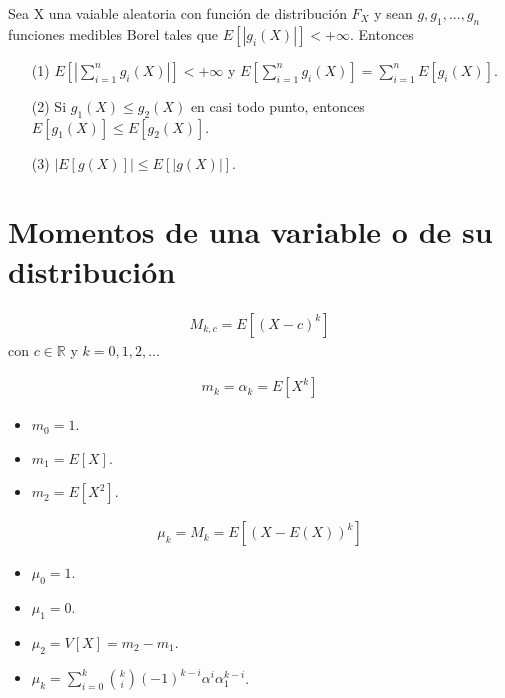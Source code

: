 \begin{prop}
    Sea X una vaiable aleatoria con función de distribución $F_X$ y sean $g,g_1,...,g_n$ funciones medibles Borel tales que $E[|g_i(X)|] < +\infty$. Entonces
    \begin{enumerate}
        \item[(1)] $E[|\sum_{i=1}^{n}g_i(X)|] < +\infty$ y $E[\sum_{i=1}^{n}g_i(X)] = \sum_{i=1}^{n}{E[g_i(X)]}$.
        \item[(2)] Si $g_1(X) \leq g_2(X)$ en casi todo punto, entonces $E[g_1(X)] \leq E[g_2(X)]$.
        \item[(3)] $|E[g(X)]| \leq E[|g(X)|]$.
    \end{enumerate}
\end{prop}

\section{Momentos de una variable o de su distribución}

\begin{defi}
    \begin{align*}
        M_{k,c} = E[(X - c)^k]
    \end{align*}
    con $c \in \mathbb{R}$ y $k = 0, 1, 2,...$
\end{defi}

\begin{defi}
    \begin{align*}
        m_k = \alpha_k = E[X^k]
    \end{align*}
    \begin{itemize}
        \item $m_0 = 1$.
        \item $m_1 = E[X]$.
        \item $m_2 = E[X^2]$.
    \end{itemize}
\end{defi}

\begin{defi}
    \begin{align*}
        \mu_k = M_k =  E[(X - E(X))^k]
    \end{align*}
    \begin{itemize}
        \item $\mu_0 = 1$.
        \item $\mu_1 = 0$.
        \item $\mu_2 = V[X] = m_2 - m_1$.
        \item $\mu_k = \sum_{i=0}^{k}\binom{k}{i}(-1)^{k-i}\alpha^i\alpha_1^{k-i}$.
    \end{itemize}
\end{defi}

